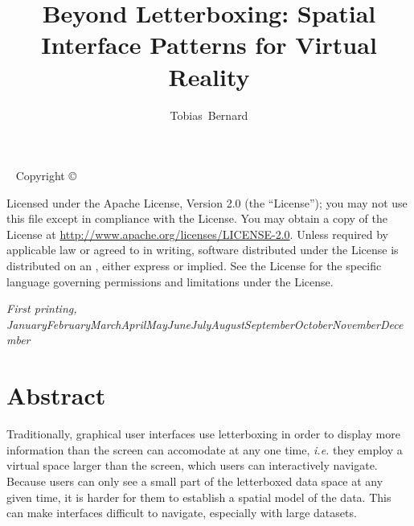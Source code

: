 \documentclass{tufte-book} %
\title{Beyond Letterboxing: Spatial Interface Patterns for Virtual Reality} %
\author[Tobias Bernard]{Tobias\ Bernard} %
\newcommand{\monthyear}{\ifcase\month\or January\or February\or March\or April\or May\or June\or July\or August\or September\or October\or November\or December\fi\space\number\year} %
\newcommand{\hairsp}{\hspace{1pt}} %
\newcommand{\ie}{\textit{i.\hairsp{}e.}\xspace} %
\begin{document}
\frontmatter



\maketitlepage %


\newpage
\begin{fullwidth}
~\vfill
\thispagestyle{empty}
\setlength{\parindent}{0pt}
\setlength{\parskip}{\baselineskip}
Copyright \copyright\ \the\year\ \thanklessauthor

\par{}

\par{}

\par Licensed under the Apache License, Version 2.0 (the ``License''); you may not use this file except in compliance with the License. You may obtain a copy of the License at \url{http://www.apache.org/licenses/LICENSE-2.0}. Unless required by applicable law or agreed to in writing, software distributed under the License is distributed on an , either express or implied. See the License for the specific language governing permissions and limitations under the License.

\par\textit{First printing, \monthyear}
\end{fullwidth}


\tableofcontents %


\mainmatter


\chapter{Abstract}

Traditionally, graphical user interfaces use letterboxing in order to display more information than the screen can accomodate at any one time, \ie they employ a virtual space larger than the screen, which users can interactively navigate. Because users can only see a small part of the letterboxed data space at any given time, it is harder for them to establish a spatial model of the data. This can make interfaces difficult to navigate, especially with large datasets.
\end{document}
